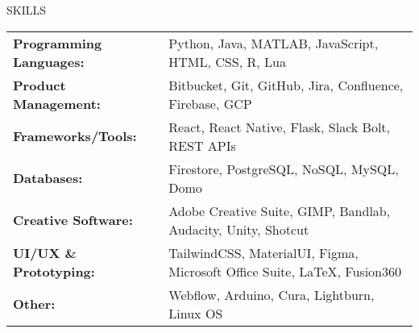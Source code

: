 \documentclass{resume} %
\begin{document}
\begin{rSection}{SKILLS}

\begin{tabular}{ @{} >{\bfseries}l @{\hspace{6ex}} l }
Programming Languages: & Python, Java, MATLAB, JavaScript, HTML, CSS, R, Lua\\
Product Management: & Bitbucket, Git, GitHub, Jira, Confluence, Firebase, GCP\\
Frameworks/Tools: &  React, React Native, Flask, Slack Bolt, REST APIs\\
Databases: & Firestore, PostgreSQL, NoSQL, MySQL, Domo \\
Creative Software: & Adobe Creative Suite, GIMP, Bandlab, Audacity, Unity, Shotcut\\
UI/UX \& Prototyping: & TailwindCSS, MaterialUI, Figma, Microsoft Office Suite, LaTeX, Fusion360\\
Other: & Webflow, Arduino, Cura, Lightburn, Linux OS\\

\end{tabular}\\
\end{rSection}
\end{document}

